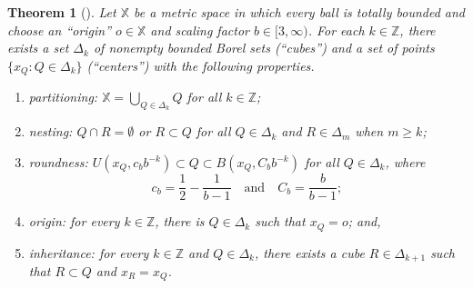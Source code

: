 \documentclass[12pt]{amsart}
\newtheorem{theorem}{Theorem}[section]
\theoremstyle{definition}
\theoremstyle{remark}
\newcommand{\ZZ}{\mathbb{Z}}
\newcommand{\XX}{\mathbb{X}}
\numberwithin{figure}{section}
\numberwithin{equation}{section}
\begin{document}
\begin{theorem}[{\cite[Theorem 2.1]{KRS-cubes}}] \label{KRS-cubes} Let $\XX$ be a metric space in which every ball is totally bounded and choose an ``origin'' $o\in \XX$ and scaling factor $b\in[3,\infty)$. For each $k\in\ZZ$, there exists a set $\Delta_k$ of nonempty bounded Borel sets (``cubes'') and a set of points $\{x_Q:Q\in\Delta_k\}$ (``centers'') with the following properties. \begin{enumerate}
\item partitioning: $\XX=\bigcup_{Q\in\Delta_k} Q$ for all $k\in\ZZ$;
\item nesting: $Q\cap R=\emptyset$ or $R\subset Q$ for all $Q\in\Delta_k$ and $R\in \Delta_m$ when $m\geq k$;
\item roundness: $U(x_Q,c_b b^{-k})\subset Q\subset B(x_Q,C_b b^{-k})$ for all $Q\in\Delta_k$, where $$c_b=\frac{1}{2} - \frac{1}{b-1}\quad\text{and}\quad C_b= \frac{b}{b-1};$$
\item origin: for every $k\in\ZZ$, there is $Q\in\Delta_k$ such that $x_Q=o$; and,
\item inheritance: for every $k\in\ZZ$ and $Q\in \Delta_k$, there exists a cube $R\in\Delta_{k+1}$ such that $R\subset Q$ and $x_R=x_Q$.
\end{enumerate}
\end{theorem}
\end{document}
